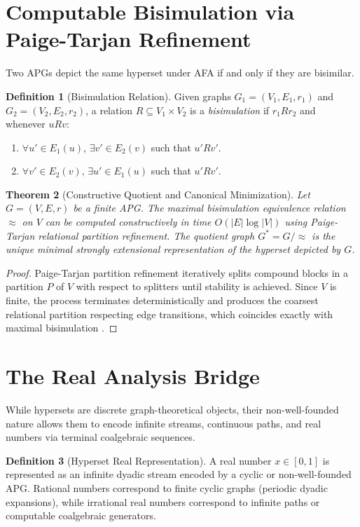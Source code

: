 \documentclass[11pt]{article}
\newtheorem{theorem}{Theorem}[section]
\theoremstyle{definition}
\newtheorem{definition}[theorem]{Definition}
\begin{document}
\section{Computable Bisimulation via Paige-Tarjan Refinement}
Two APGs depict the same hyperset under AFA if and only if they are bisimilar.

\begin{definition}[Bisimulation Relation]
Given graphs $G_1 = (V_1, E_1, r_1)$ and $G_2 = (V_2, E_2, r_2)$, a relation $R \subseteq V_1 \times V_2$ is a \emph{bisimulation} if $r_1 R r_2$ and whenever $u R v$:
\begin{enumerate}
\item $\forall u' \in E_1(u),\, \exists v' \in E_2(v)$ such that $u' R v'$.
\item $\forall v' \in E_2(v),\, \exists u' \in E_1(u)$ such that $u' R v'$.
\end{enumerate}
\end{definition}

\begin{theorem}[Constructive Quotient and Canonical Minimization]
Let $G = (V, E, r)$ be a finite APG. The maximal bisimulation equivalence relation $\approx$ on $V$ can be computed constructively in time $O(|E| \log |V|)$ using Paige-Tarjan relational partition refinement. The quotient graph $G^* = G / \approx$ is the unique minimal strongly extensional representation of the hyperset depicted by $G$.
\end{theorem}
\begin{proof}
Paige-Tarjan partition refinement iteratively splits compound blocks in a partition $P$ of $V$ with respect to splitters until stability is achieved. Since $V$ is finite, the process terminates deterministically and produces the coarsest relational partition respecting edge transitions, which coincides exactly with maximal bisimulation \cite{paige_tarjan}.
\end{proof}

\section{The Real Analysis Bridge}
While hypersets are discrete graph-theoretical objects, their non-well-founded nature allows them to encode infinite streams, continuous paths, and real numbers via terminal coalgebraic sequences.

\begin{definition}[Hyperset Real Representation]
A real number $x \in [0, 1]$ is represented as an infinite dyadic stream encoded by a cyclic or non-well-founded APG. Rational numbers correspond to finite cyclic graphs (periodic dyadic expansions), while irrational real numbers correspond to infinite paths or computable coalgebraic generators.
\end{definition}
\end{document}
